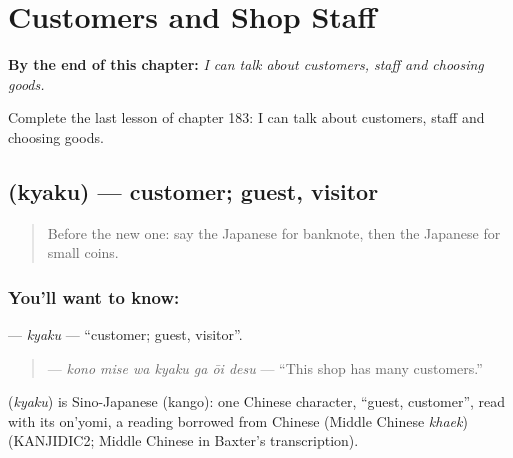 
\chapter{Customers and Shop Staff}
\label{ch:ja-customers-and-shop-staff}

\begin{chapteropening}
\textbf{By the end of this chapter:} \emph{I can talk about customers, staff and choosing goods.}

Complete the last lesson of chapter 183: I can talk about customers, staff and choosing goods.
\end{chapteropening}

\section[\texorpdfstring{\ja{きゃく} (kyaku)}{きゃく (kyaku)}]{ (kyaku) — customer; guest, visitor}

\label{lesson:JA-C183-kyaku}



\begin{quote}
Before the new one: say the Japanese for banknote, then the Japanese for small coins.
\end{quote}

\subsection*{You'll want to know: }
\textbf{} — \emph{kyaku} — \textquotedblleft{}customer; guest, visitor\textquotedblright{}.

\begin{quote}
\textbf{   } — \emph{kono mise wa kyaku ga ōi desu} — \textquotedblleft{}This shop has many customers.\textquotedblright{}
\end{quote}

\begin{cousinweb}
\textbf{} (\emph{kyaku}) is Sino-Japanese (kango): one Chinese character, \textquotedblleft{}guest, customer\textquotedblright{}, read with its on'yomi, a reading borrowed from Chinese (Middle Chinese \emph{khaek}) (KANJIDIC2; Middle Chinese in Baxter's transcription).
\end{cousinweb}

